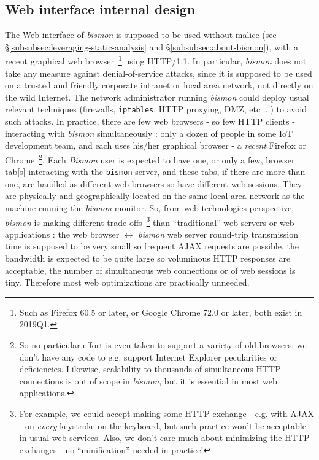 {\color{red}{@@ to be completed a lot,
    explaining conversions of Bismon values to and from JSON.}}

\subsection{Web interface internal design}
\label{subsec:webinterf}

The Web interface  of \emph{bismon} is supposed
to be used without malice (see
§\ref{subsubsec:leveraging-static-analysis} and
§\ref{subsubsec:about-bismon}), with a recent graphical web
browser~\footnote{Such as Firefox 60.5 or later, or Google Chrome 72.0
  or later, both exist in 2019Q1.}  using HTTP/1.1. In particular,
\emph{bismon} does not take any measure against
 denial-of-service attacks, since it is
supposed to be used on a trusted and friendly corporate intranet or
local area network, not directly on the wild Internet. The network
administrator running \emph{bismon} could deploy usual relevant
techniques (firewalls, \texttt{iptables}, HTTP proxying, DMZ, etc ...)
to avoid such attacks. In practice, there are few web browsers - so
few HTTP clients - interacting with \emph{bismon} simultaneously :
only a dozen of people in some IoT development team, and each uses
his/her graphical browser  - a \emph{recent} Firefox or
Chrome~\footnote{So no particular effort is even taken to support a
  variety of old browsers: we don't have any code to e.g. support
  Internet Explorer pecularities or deficiencies. Likewise,
  scalability to thousands of simultaneous HTTP connections is out of
  scope in \emph{bismon}, but it is essential in most web
  applications.}. Each \emph{Bismon} user is expected to have one, or
only a few, browser tab[s] interacting with the \texttt{bismon}
server, and these tabs, if there are more than one, are handled as
different web browsers so have different web sessions.  They are
physically and geographically located on the same local area network
as the machine running the \emph{bismon} monitor. So, from web
technologies perspective, \emph{bismon} is making different
trade-offs~\footnote{For example, we could accept making some HTTP
  exchange - e.g. with AJAX - on \emph{every} keystroke on the
  keyboard, but such practice won't be acceptable in usual web
  services. Also, we don't care much about minimizing the HTTP
  exchanges - no ``minification'' needed in practice!} than
``traditional'' web servers or web applications : the web browser
$\leftrightarrow$ \emph{bismon} web server round-trip transmission
time is supposed to be very small so frequent AJAX requests are
possible, the bandwidth is expected to be quite large so voluminous
HTTP responses are acceptable, the number of simultaneous web
connections or of web sessions is tiny. Therefore most web
optimizations are practically unneeded.

